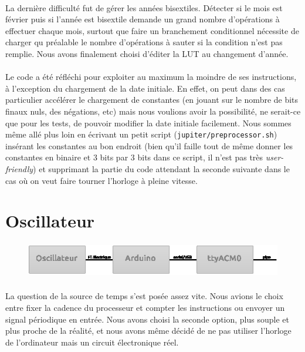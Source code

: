 \documentclass{article}
\begin{document}
\paragraph{}La dernière difficulté fut de gérer les années bisextiles. Détecter si le mois est février puis si l'année est bisextile demande un grand nombre d'opérations à effectuer chaque mois, surtout que faire un branchement conditionnel nécessite de charger qu préalable le nombre d'opérations à sauter si la condition n'est pas remplie. Nous avons finalement choisi d'éditer la LUT au changement d'année.

\paragraph{}Le code a été réfléchi pour exploiter au maximum la moindre de ses instructions, à l'exception du chargement de la date initiale. En effet, on peut dans des cas particulier accélérer le chargement de constantes (en jouant sur le nombre de bits finaux nuls, des négations, etc) mais nous voulions avoir la possibilité, ne serait-ce que pour les tests, de pouvoir modifier la date initiale facilement. Nous sommes même allé plus loin en écrivant un petit script (\texttt{jupiter/preprocessor.sh}) insérant les constantes au bon endroit (bien qu'il faille tout de même donner les constantes en binaire et 3 bits par 3 bits dans ce script, il n'est pas très \emph{user-friendly}) et supprimant la partie du code attendant la seconde suivante dans le cas où on veut faire tourner l'horloge à pleine vitesse.





\section{Oscillateur}

\begin{figure}[h]
\centering
\includegraphics[height=4em]{zoom_input.eps}
\end{figure}

\paragraph{}La question de la source de temps s'est posée assez vite. Nous avions le choix entre fixer la cadence du processeur et compter les instructions ou envoyer un signal périodique en entrée. Nous avons choisi la seconde option, plus souple et plus proche de la réalité, et nous avons même décidé de ne pas utiliser l'horloge de l'ordinateur mais un circuit électronique réel.
\end{document}
